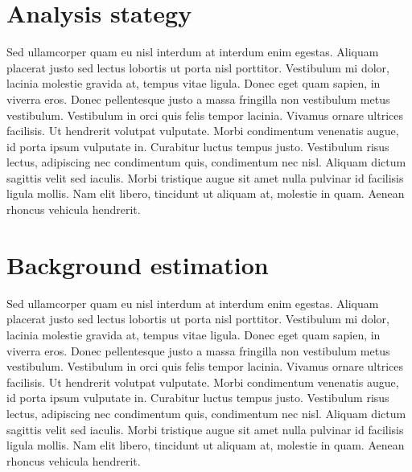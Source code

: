 
\section{Analysis stategy}

Sed ullamcorper quam eu nisl interdum at interdum enim egestas. Aliquam placerat justo sed lectus lobortis ut porta nisl porttitor. Vestibulum mi dolor, lacinia molestie gravida at, tempus vitae ligula. Donec eget quam sapien, in viverra eros. Donec pellentesque justo a massa fringilla non vestibulum metus vestibulum. Vestibulum in orci quis felis tempor lacinia. Vivamus ornare ultrices facilisis. Ut hendrerit volutpat vulputate. Morbi condimentum venenatis augue, id porta ipsum vulputate in. Curabitur luctus tempus justo. Vestibulum risus lectus, adipiscing nec condimentum quis, condimentum nec nisl. Aliquam dictum sagittis velit sed iaculis. Morbi tristique augue sit amet nulla pulvinar id facilisis ligula mollis. Nam elit libero, tincidunt ut aliquam at, molestie in quam. Aenean rhoncus vehicula hendrerit.


\section{Background estimation}
\label{sec:background-estimation}

Sed ullamcorper quam eu nisl interdum at interdum enim egestas. Aliquam placerat justo sed lectus lobortis ut porta nisl porttitor. Vestibulum mi dolor, lacinia molestie gravida at, tempus vitae ligula. Donec eget quam sapien, in viverra eros. Donec pellentesque justo a massa fringilla non vestibulum metus vestibulum. Vestibulum in orci quis felis tempor lacinia. Vivamus ornare ultrices facilisis. Ut hendrerit volutpat vulputate. Morbi condimentum venenatis augue, id porta ipsum vulputate in. Curabitur luctus tempus justo. Vestibulum risus lectus, adipiscing nec condimentum quis, condimentum nec nisl. Aliquam dictum sagittis velit sed iaculis. Morbi tristique augue sit amet nulla pulvinar id facilisis ligula mollis. Nam elit libero, tincidunt ut aliquam at, molestie in quam. Aenean rhoncus vehicula hendrerit.

